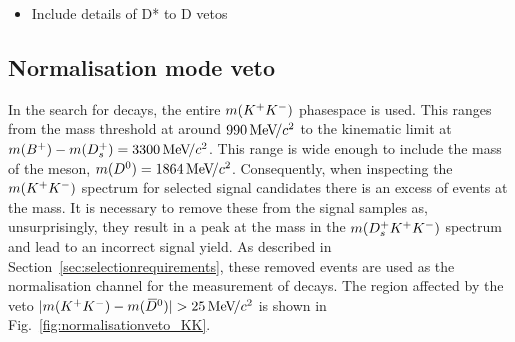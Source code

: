 {\color{Red}
\begin{itemize}
\item Include details of D* to D vetos
\end{itemize}
}

\subsection{Normalisation mode veto}
\label{sec:normvetos}

In the search for \decay{\Bp}{\Dsp\Kp\Km} decays, the entire $m({{K}^+}{{K}^-})$ phasespace is used. This ranges from the \Kp\Km mass threshold at around $990{\mathrm{\,Me\kern -0.1em V\!/}c^2}$ to the kinematic limit at $m({{{B}^+}}) - m({{D}^+_{s}}) = 3300{\mathrm{\,Me\kern -0.1em V\!/}c^2}$. This range is wide enough to include the mass of the \Dzb meson, $m({{D}^0}) = 1864 {\mathrm{\,Me\kern -0.1em V\!/}c^2}$. Consequently, when inspecting the $m({{K}^+}{{K}^-})$ spectrum for selected signal candidates there is an excess of events at the \Dz mass. It is necessary to remove these from the signal samples as, unsurprisingly, they result in a peak at the \Bp mass in the $m({{D}^+_{s}}{{K}^+}{{K}^-})$ spectrum and lead to an incorrect signal yield. As described in Section~\ref{sec:selectionrequirements}, these removed events are used as the normalisation channel for the measurement of \decay{\Bp}{\Dsp\Kp\Km} decays. 
The region affected by the veto $|m({{K}^+}{{K}^-}) - m({{\kern 0.2em\overline{\kern -0.2em D}{}}{}^0})| > 25 {\mathrm{\,Me\kern -0.1em V\!/}c^2}$ is shown in Fig.~\ref{fig:normalisationveto_KK}.


